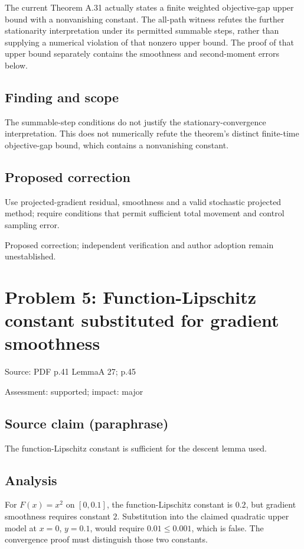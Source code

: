 \documentclass[11pt]{article}
\begin{document}
The current Theorem A.31 actually states a finite weighted objective-gap upper bound with a nonvanishing constant. The all-path witness refutes the further stationarity interpretation under its permitted summable steps, rather than supplying a numerical violation of that nonzero upper bound. The proof of that upper bound separately contains the smoothness and second-moment errors below.

\subsection*{Finding and scope}

The summable-step conditions do not justify the stationary-convergence interpretation. This does not numerically refute the theorem's distinct finite-time objective-gap bound, which contains a nonvanishing constant.

\subsection*{Proposed correction}

Use projected-gradient residual, smoothness and a valid stochastic projected method; require conditions that permit sufficient total movement and control sampling error.

Proposed correction; independent verification and author adoption remain unestablished.

\section*{Problem 5: Function-Lipschitz constant substituted for gradient smoothness}

Source: PDF p.41 LemmaA 27; p.45

Assessment: supported; impact: major

\subsection*{Source claim (paraphrase)}

The function-Lipschitz constant is sufficient for the descent lemma used.

\subsection*{Analysis}

For \(F(x)=x^2\) on \([0,0.1]\), the function-Lipschitz constant is \(0.2\), but gradient smoothness requires constant \(2\). Substitution into the claimed quadratic upper model at \(x=0\), \(y=0.1\), would require \(0.01\le0.001\), which is false. The convergence proof must distinguish those two constants.
\end{document}
